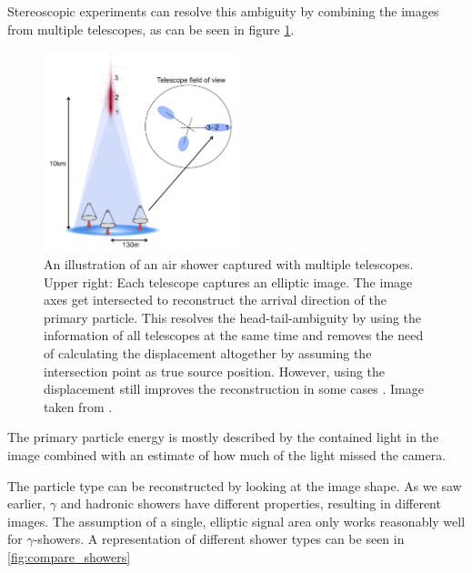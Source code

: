 Stereoscopic experiments can resolve this ambiguity by combining the images from 
multiple telescopes, as can be seen in figure \ref{fig:stereo_shower}.

\begin{figure}
	\centering
	\includegraphics[width=0.5\textwidth]{images/stereo_shower.png}
	\caption{An illustration of an air shower captured with multiple telescopes.
		Upper right: Each telescope captures an elliptic image.
		The image axes get intersected to reconstruct the arrival direction
		of the primary particle. This resolves the head-tail-ambiguity
		by using the information of all telescopes at the same time
		and removes the need of calculating the displacement altogether by
		assuming the intersection point as true source position.
		However, using the displacement still improves the reconstruction 
		in some cases \cite{some magic paper states that }.
	    Image taken from \cite{holder2015atmospheric}.}
	\label{fig:stereo_shower}
\end{figure}

The primary particle energy is mostly described by the contained light in the image combined with 
an estimate of how much of the light missed the camera. 

The particle type can be reconstructed 
by looking at the image shape.
As we saw earlier, $\gamma$ and hadronic showers have different properties, 
resulting in different images. The assumption of a single, elliptic signal
area only works reasonably well for $\gamma$-showers.
A representation of different shower types can be seen in \ref{fig:compare_showers}


